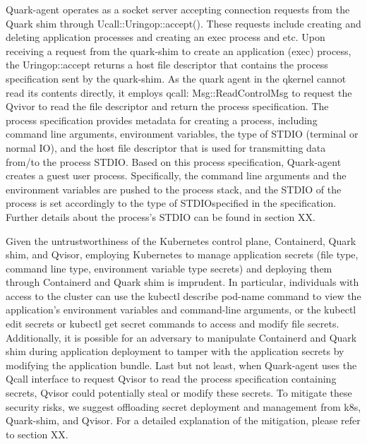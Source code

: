 Quark-agent operates as a socket server accepting connection requests from the Quark shim through Ucall::Uringop::accept(). These requests include creating and deleting application processes and creating an exec process 
and etc. Upon receiving a request from the quark-shim to create an application (exec) process, the Uringop::accept returns a host file descriptor that contains the process specification sent by the quark-shim. As the quark agent in the qkernel cannot
 read its contents directly, it employs qcall: Msg::ReadControlMsg to request the Qvivor to read the file descriptor and return the process specification. The process specification provides metadata for creating a process, including command line arguments, environment variables, the type of STDIO (terminal or normal IO), and the host file descriptor that is used for transmitting data from/to the process STDIO. Based on this process specification, Quark-agent creates a guest user process. Specifically, the command line arguments and the environment variables are pushed to the process stack, and the STDIO of the process is set accordingly to the type of STDIOspecified in the specification. Further details about the process's STDIO can be found in section XX.

Given the untrustworthiness of the Kubernetes control plane\cite*{k8s}, Containerd\cite*{containerd}, Quark shim, and Qvisor, employing Kubernetes to manage application secrets (file type, command line type, environment variable type secrets) and deploying them through 
Containerd and Quark shim is imprudent. In particular, individuals with access to the cluster can use the kubectl describe pod-name command to view the application's environment variables and command-line arguments, or the kubectl edit secrets 
or kubectl get secret commands to access and modify file secrets. Additionally, it is possible for an adversary to manipulate Containerd and Quark shim during application deployment to tamper with the application secrets by modifying the application 
bundle. Last but not least, when Quark-agent uses the Qcall interface to request Qvisor to read the process specification containing secrets, Qvisor could potentially steal or modify these secrets. To mitigate these security risks, we suggest 
offloading secret deployment and management from k8s, Quark-shim, and Qvisor. For a detailed explanation of the mitigation, please refer to section XX.

